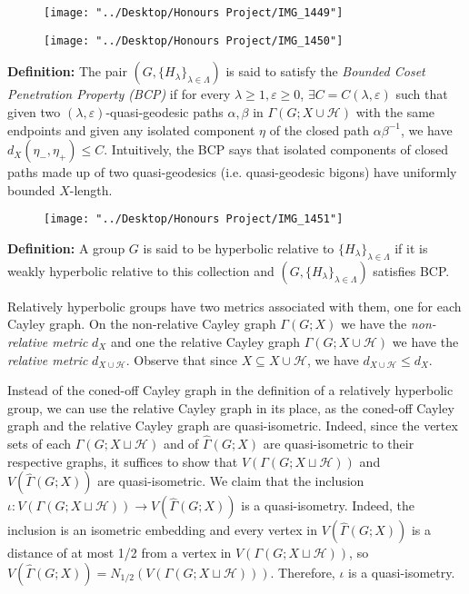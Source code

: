 \documentclass[12pt]{article}
\newcommand{\vs}{\vskip10pt}
\begin{document}
\begin{figure} [h]
	\centering
	\texttt{[image: "../Desktop/Honours Project/IMG\_1449"]}
	\caption{}
	\label{fig:img1449}
\end{figure}

\begin{figure} [h]
	\centering
	\texttt{[image: "../Desktop/Honours Project/IMG\_1450"]}
	\caption{}
	\label{fig:img1450}
\end{figure}

	
	\vs 
	
	\textbf{Definition: } The pair $(G, \{H_{\lambda}\}_{\lambda \in \Lambda})$ is said to satisfy the \textit{Bounded Coset Penetration Property (BCP)} if for every $\lambda \geq 1, \varepsilon \geq 0$, $\exists C = C(\lambda, \varepsilon)$ such that given two $(\lambda, \varepsilon)$-quasi-geodesic paths $\alpha, \beta$ in $\Gamma(G; X \cup \mathcal{H})$ with the same endpoints and given any isolated component $\eta$ of the closed path $\alpha\beta^{-1}$, we have $d_X(\eta_{-}, \eta_{+}) \leq C$. Intuitively, the BCP says that isolated components of closed paths made up of two quasi-geodesics (i.e. quasi-geodesic bigons) have uniformly bounded $X$-length. 
	
\begin{figure} [h]
	\centering
	\texttt{[image: "../Desktop/Honours Project/IMG\_1451"]}
	\caption{}
	\label{fig:img1451}
\end{figure}
	
	\vs 
	
	\textbf{Definition: } A group $G$ is said to be hyperbolic relative to $\{H_{\lambda}\}_{\lambda \in \Lambda}$ if it is weakly hyperbolic relative to this collection and $(G, \{H_{\lambda}\}_{\lambda \in \Lambda})$ satisfies BCP. 
	
	\vs 
	
	Relatively hyperbolic groups have two metrics associated with them, one for each Cayley graph. On the non-relative Cayley graph $\Gamma(G;X)$ we have the \textit{non-relative metric} $d_X$ and one the relative Cayley graph $\Gamma(G; X \cup \mathcal{H})$ we have the \textit{relative metric} $d_{X \cup \mathcal{H}}$. Observe that since $X \subseteq X \cup \mathcal{H}$, we have $d_{X \cup \mathcal{H}} \leq d_X$.
	
	\vs 
	
	Instead of the coned-off Cayley graph in the definition of a relatively hyperbolic group, we can use the relative Cayley graph in its place, as the coned-off Cayley graph and the relative Cayley graph are quasi-isometric. Indeed, since the vertex sets of each $\Gamma(G; X \sqcup \mathcal{H})$ and of $\hat{\Gamma}(G;X)$ are quasi-isometric to their respective graphs, it suffices to show that $V(\Gamma(G; X \sqcup \mathcal{H}))$ and $V(\hat{\Gamma}(G;X))$ are quasi-isometric. We claim that the inclusion $\iota: V(\Gamma(G; X \sqcup \mathcal{H})) \rightarrow V(\hat{\Gamma}(G;X))$ is a quasi-isometry. Indeed, the inclusion is an isometric embedding and every vertex in $V(\hat{\Gamma}(G;X))$ is a distance of at most 1/2 from a vertex in $V(\Gamma(G; X \sqcup \mathcal{H}))$, so $V(\hat{\Gamma}(G;X)) = N_{1/2} (V(\Gamma(G; X \sqcup \mathcal{H})))$. Therefore, $\iota$ is a quasi-isometry. 
	
\end{document}
